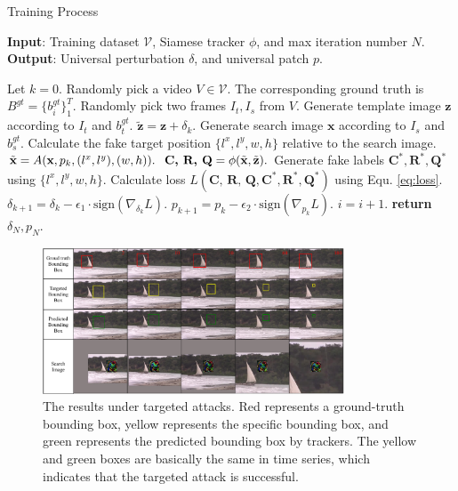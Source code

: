 \documentclass{article}
\begin{document}
\begin{algorithm}[tb]
\caption{Training Process}
\label{alg:algorithm}
\textbf{Input}: Training dataset $\mathcal{V}$, Siamese tracker $\phi$, and max iteration number $N$.\\
\textbf{Output}: Universal perturbation $\delta$, and universal patch $p$.
\begin{algorithmic}[1] %
\STATE Let $k = 0$.
\STATE Randomly pick a video $V\in \mathcal{V}$. The corresponding ground truth is $B^{gt}=\{b^{gt}_i\}^T_1$.
\STATE Randomly pick two frames $I_t, I_s$ from $V$.
\STATE Generate template image $\textbf{z}$ according to $I_t$ and $b^{gt}_t$.
\STATE $\tilde{\textbf{z}} = \textbf{z} + \delta_k.$
\STATE Generate search image $\textbf{x}$ according to $I_s$ and $b^{gt}_s$.
\STATE Calculate the fake target position $\{l^x, l^y, w, h\}$ relative to the search image.
\STATE $\tilde{\textbf x} = A(\textbf x, p_k, (l^x, l^y), (w, h)).$
\STATE $\textbf{C, R, Q} = \phi(\tilde {\textbf x}, \tilde{\textbf z}).$
\STATE Generate fake labels $\textbf{C}^*,\textbf{R}^*,\textbf{Q}^*$ using $\{l^x, l^y, w, h\}$.
\STATE Calculate loss $L(\textbf{C, R, Q}, \textbf{C}^*, \textbf{R}^*, \textbf{Q}^*)$ using Equ. \ref{eq:loss}.
\STATE $\delta_{k+1} = \delta_{k} - \epsilon_1 \cdot \text{sign}(\nabla_{\delta_k}L).$
\STATE $p_{k+1} = p_{k} - \epsilon_2 \cdot \text{sign}(\nabla_{p_k}L).$
\STATE $i = i + 1.$
\ENDWHILE
\STATE \textbf{return} $\delta_N, p_N.$
\end{algorithmic}
\end{algorithm}

\begin{figure}[t]
\centering
\includegraphics[width=0.80\textwidth]{images/vis_v3.pdf}
\caption{The results under targeted attacks. Red represents a ground-truth bounding box, yellow represents the specific bounding box, and green represents the predicted bounding box by trackers. The yellow and green boxes are basically the same in time series, which indicates that the targeted attack is successful.}
\label{fig:vis}
\end{figure}
\end{document}
